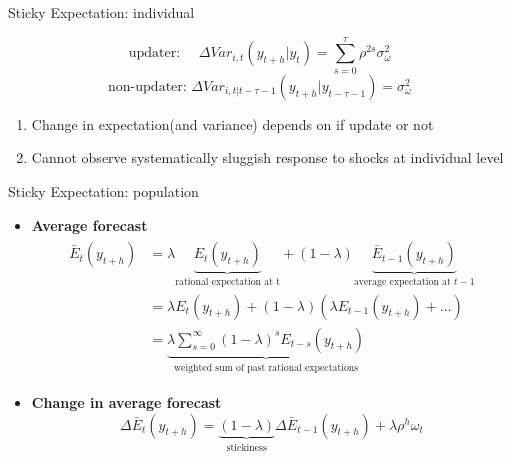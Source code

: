 \documentclass{beamer}
\begin{document}
\begin{frame}{Sticky Expectation: individual}

$$\text{updater: } \quad \Delta Var_{i,t}(y_{t+h}|y_t)= \sum^{\tau}_{s=0} \rho^{2s}\sigma^2_{\omega}$$
$$\text{non-updater: }  \Delta Var_{i,t|t-\tau-1}(y_{t+h}|y_{t-\tau-1})  = \sigma^2_{\omega}$$


\begin{enumerate}
\item Change in expectation(and variance) depends on if update or not 
\item Cannot observe systematically sluggish response to shocks at individual level 
\end{enumerate}

\end{frame}



\begin{frame}{Sticky Expectation: population}
\begin{itemize}
	\item \textbf{Average forecast} 
	\begin{eqnarray*}
		\begin{aligned}
			\bar E_t(y_{t+h}) & = \lambda \underbrace{E_t(y_{t+h})}_{\text{rational expectation at t}} + (1-\lambda) \underbrace{\bar E_{t-1}(y_{t+h})}_{\text{average expectation at } t-1} \\
			& = \lambda E_t(y_{t+h}) + (1-\lambda) (\lambda E_{t-1}(y_{t+h})+ ...) \\
			& =\underbrace{ \lambda \sum^{\infty}_{s=0} (1-\lambda)^s E_{t-s}(y_{t+h})}_{\text{weighted sum of past rational expectations}}
		\end{aligned}
	\end{eqnarray*}
	\item \textbf{Change in average forecast}
	$$\Delta \bar E_t(y_{t+h})=\underbrace{(1-\lambda)}_{\text{stickiness}} \Delta \bar E_{t-1}(y_{t+h}) + \lambda \rho^h \omega_t$$ 
\end{itemize}
\end{frame}
\end{document}
